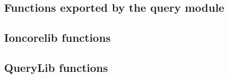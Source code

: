 \documentclass[english,a4paper,11pt,oldtoc]{artikel3}
\begin{document}


\subsection{Functions exported by the query module}
\label{sec:queryref}



\subsection{Ioncorelib functions}
\label{sec:ioncorelibref}



\subsection{QueryLib functions}
\label{sec:querylibref}



\printindex
\end{document}
